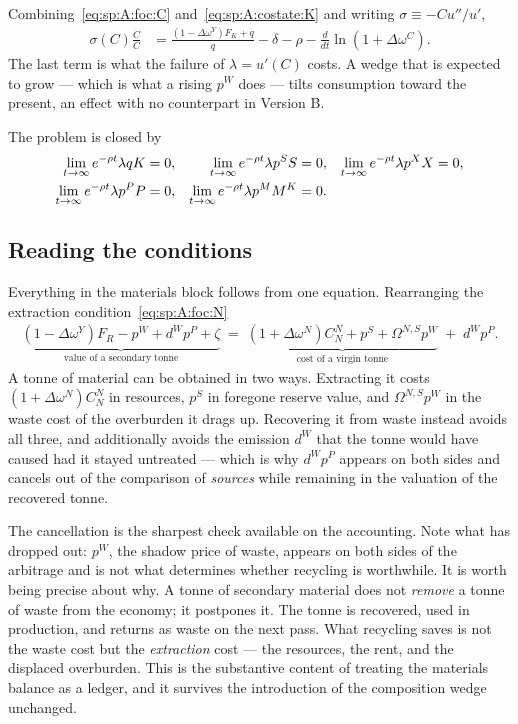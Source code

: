 Combining~\eqref{eq:sp:A:foc:C}
and~\eqref{eq:sp:A:costate:K} and writing $\sigma\equiv-Cu''/u'$,
\begin{align}
\sigma\left(C\right)\frac{\dot C}{C}
&= \frac{\left(1-\Delta\omega^Y\right)F_K+\dot q}{q}-\delta-\rho
-\frac{d}{dt}\ln\!\left(1+\Delta\omega^C\right).
\label{eq:sp:A:euler}
\end{align}
The last term is what the failure of $\lambda=u'(C)$ costs. A wedge that is expected to grow --- which
is what a rising $p^W$ does --- tilts consumption toward the present, an effect with no counterpart in
Version B.

 The problem is closed by
\begin{align}
\lim_{t\to\infty}e^{-\rho t}\lambda q K &= 0,
&
\lim_{t\to\infty}e^{-\rho t}\lambda p^S S &= 0,
&
\lim_{t\to\infty}e^{-\rho t}\lambda p^X X &= 0,
\notag\\
\lim_{t\to\infty}e^{-\rho t}\lambda p^P P &= 0,
&
\lim_{t\to\infty}e^{-\rho t}\lambda p^M M^K &= 0 .
&&
\label{eq:sp:A:tvc}
\end{align}


\subsection{Reading the conditions}\label{sec:sp:A:reading}

 Everything in the materials block follows from one equation.
Rearranging the extraction condition~\eqref{eq:sp:A:foc:N}
\begin{align}
\underbrace{\left(1-\Delta\omega^Y\right)F_R-p^W+d^Wp^P+\zeta}_{\text{value of a secondary tonne}}
\;=\;
\underbrace{\left(1+\Delta\omega^N\right)C^N_N+p^S+\Omega^{N,S}p^W}_{\text{cost of a virgin tonne}}
\;+\;d^Wp^P .
\label{eq:sp:A:arbitrage}
\end{align}
A tonne of material can be obtained in two ways. Extracting it costs
$\left(1+\Delta\omega^N\right)C^N_N$ in resources, $p^S$ in foregone reserve value, and
$\Omega^{N,S}p^W$ in the waste cost of the overburden it drags up. Recovering it from waste instead
avoids all three, and additionally avoids the emission $d^W$ that the tonne would have caused had it
stayed untreated --- which is why $d^Wp^P$ appears on both sides and cancels out of the comparison of
\emph{sources} while remaining in the valuation of the recovered tonne.

The cancellation is the sharpest check available on the accounting. Note what has dropped out: $p^W$,
the shadow price of waste, appears on both sides of the arbitrage and is not what determines whether
recycling is worthwhile. It is worth being precise about why. A tonne of secondary material does not
\emph{remove} a tonne of waste from the economy; it postpones it. The tonne is recovered, used in
production, and returns as waste on the next pass. What recycling saves is not the waste cost but the
\emph{extraction} cost --- the resources, the rent, and the displaced overburden. This is the
substantive content of treating the materials balance as a ledger, and it survives the introduction of
the composition wedge unchanged.

